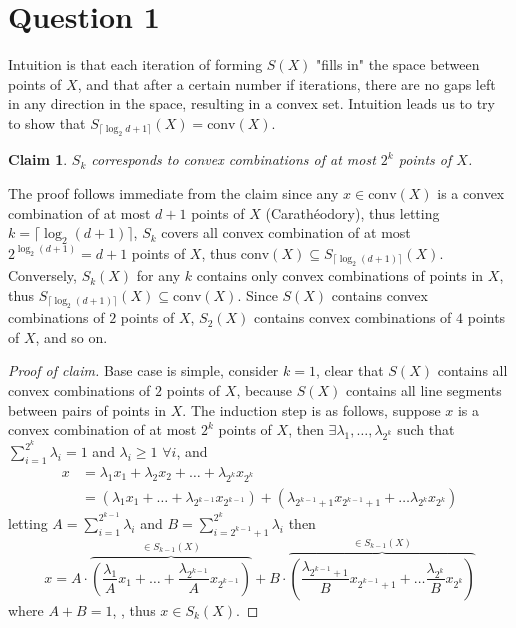 \documentclass[a4paper,11pt]{article}
\newcommand{\asstnumber}{3}
\newcommand{\assigntop}{
  \fancyhead[L]{}
  \fancyhead[C]{\Large Math 550 -- Winter 2024\\ Assignment \asstnumber}
  \fancyhead[R]{ }
}
\newtheorem{claim}[theorem]{Claim}
\begin{document}
\assigntop


\section*{Question 1}

Intuition is that each iteration of forming $S(X)$ "fills in" the space between points of $X$, and that after a certain number if iterations, there are no gaps left in any direction in the space, resulting in a convex set. Intuition leads us to try to show that $S_{\lceil \log_2 d+1 \rceil}(X) = \text{conv}(X)$. \\
\begin{claim}$S_k$ corresponds to convex combinations of at most $2^{k}$ points of $X$. 	
\end{claim}
The proof follows immediate from the claim since any $x \in \text{conv}(X)$ is a convex combination of at most $d+1$ points of $X$ (Carath\'{e}odory), thus letting $k = \lceil \log_2(d+1) \rceil$, $S_k$ covers all convex combination of at most $2^{\log_2(d+1)} = d+1 $ points of $X$, thus $\text{conv}(X) \subseteq S_{\lceil \log_2 (d+1) \rceil} (X)$. Conversely, $S_k(X)$ for any $k$ contains only convex combinations of points in $X$, thus $ S_{\lceil \log_2 (d+1) \rceil} (X) \subseteq \text{conv}(X) $. Since $S(X)$ contains convex combinations of $2$ points of $X$, $S_2(X)$ contains convex combinations of $4$ points of $X$, and so on. 
\begin{proof}[Proof of claim]
	Base case is simple, consider $k=1$, clear that $S(X)$ contains all convex combinations of $2$ points of $X$, because $S(X)$ contains all line segments between pairs of points in $X$. The induction step is as follows, suppose $x$ is a convex combination of at most $2^k$ points of $X$, then $\exists \lambda_1, \ldots, \lambda_{2^k}$ such that $\displaystyle \sum_{i=1}^{2^k} \lambda_i =1$ and $\lambda_i \geq 1$ $\forall i$, and 
	 \begin{align*}
	 	x &= \lambda_1 x_1 + \lambda_2 x_2 + \ldots + \lambda_{2^k} x_{2^k} \\
			&= (\lambda_1 x_1 + \ldots + \lambda_{2^{k-1}} x_{2^{k-1}}) + (\lambda_{2^{k-1}+1} x_{2^{k-1}+1} + \ldots \lambda_{2^k} x_{2^k})
	 \end{align*}
	 letting $\displaystyle A = \sum_{i=1}^{2^{k-1}} \lambda_i$ and $\displaystyle B = \sum_{i=2^{k-1}+1}^{2^k} \lambda_i$ 
	 then 
	 $$x =A \cdot \overbrace{(\frac{\lambda_1}{A} x_1 + \ldots + \frac{\lambda_{2^{k-1}}}{A} x_{2^{k-1}})}^{\in S_{k-1}(X)} + B\cdot \overbrace{(\frac{\lambda_{2^{k-1}+1}}{B} x_{2^{k-1}+1} + \ldots \frac{\lambda_{2^k}}{B} x_{2^k})}^{\in S_{k-1}(X)}$$
	 where $A + B = 1$, , thus $x \in S_k(X)$. 
	 
	
\end{proof}
\clearpage
\end{document}
